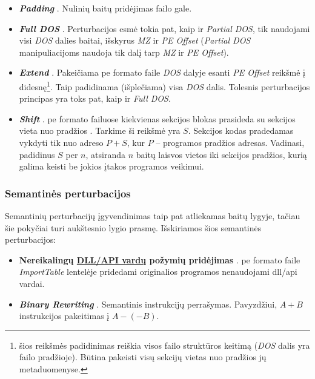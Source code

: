 \begin{itemize}
    \item \textbf{\textit{Padding}} \cite{demetrioAdversarialEXEmplesSurvey2021}. Nulinių baitų pridėjimas failo gale.
    \item \textbf{\textit{Full DOS}} \cite{demetrioAdversarialEXEmplesSurvey2021}. Perturbacijos esmė tokia pat, kaip ir \textit{Partial DOS}, tik naudojami visi \textit{DOS} dalies baitai, išskyrus \textit{MZ} ir \textit{PE Offset} (\textit{Partial DOS} manipuliacijoms naudoja tik dalį tarp \textit{MZ} ir \textit{PE Offset}).
    \item \textbf{\textit{Extend}} \cite{demetrioAdversarialEXEmplesSurvey2021}. Pakeičiama \gls{pe} formato faile \textit{DOS} dalyje esanti \textit{PE Offset} reikšmė į didesnę\footnote{\label{footnote:structure}šios reikšmės padidinimas reiškia visos failo struktūros keitimą (\textit{DOS} dalis yra failo pradžioje). Būtina pakeisti visų sekcijų vietas nuo pradžios  jų metaduomenyse.}. Taip padidinama (išplečiama) visa \textit{DOS} dalis. Tolesnis perturbacijos principas yra toks pat, kaip ir \textit{Full DOS}.
    \item \textbf{\textit{Shift}} \cite{demetrioAdversarialEXEmplesSurvey2021}. \gls{pe} formato failuose kiekvienas sekcijos blokas prasideda su sekcijos vieta nuo pradžios . Tarkime ši reikšmė yra $S$. Sekcijos kodas pradedamas vykdyti tik nuo adreso $P+S$, kur $P$ -- programos pradžios adresas. Vadinasi, padidinus $S$ per $n$, atsiranda $n$ baitų laisvos vietos iki sekcijos pradžios, kurią galima keisti be jokios įtakos programos veikimui.
\end{itemize}
\subsubsection{Semantinės perturbacijos}\label{sec:literature:perturbations:semantic}
Semantinių perturbacijų įgyvendinimas taip pat atliekamas baitų lygyje, tačiau šie pokyčiai turi aukštesnio lygio prasmę. Išskiriamos šios semantinės perturbacijos:
\begin{itemize}
    \item \textbf{Nereikalingų \hyperref[feature:dll]{DLL/API vardų} požymių pridėjimas} \cite{huGeneratingAdversarialMalware2017}. \gls{pe} formato faile \textit{ImportTable} lentelėje pridedami originalios programos nenaudojami \gls{dll}/\gls{api} vardai.
    \item \textbf{\textit{Binary Rewriting}} \cite{demetrioAdversarialEXEmplesSurvey2021}. Semantinis instrukcijų perrašymas. Pavyzdžiui, $A+B$ instrukcijos pakeitimas į $A-(-B)$.
\end{itemize}

